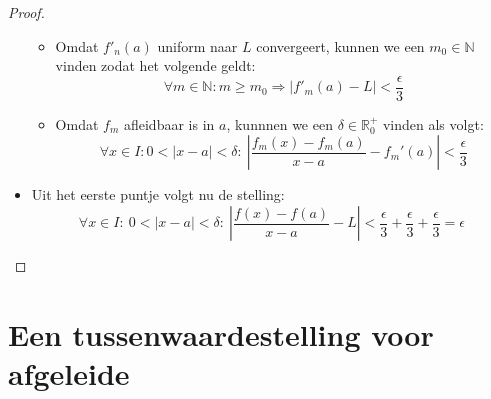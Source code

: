 \documentclass[main.tex]{subfiles}
\begin{document}
\begin{bst}
\begin{proof}
\begin{itemize}
\begin{itemize}
      \item 
        Omdat $f'_{n}(a)$ uniform naar $L$ convergeert, kunnen we een $m_{0} \in \mathbb{N}$ vinden zodat het volgende geldt:
        \[ \forall m\in \mathbb{N}: m \ge m_{0} \Rightarrow \left| f'_{m}(a) - L \right| < \frac{\epsilon}{3}\]
      \item 
        Omdat $f_{m}$ afleidbaar is in $a$, kunnnen we een $\delta \in \mathbb{R}_{0}^{+}$ vinden  als volgt:
        \[ \forall x\in I: 0 < |x-a| < \delta:\ \left| \frac{f_{m}(x)-f_{m}(a)}{x-a} - f_{m}'(a) \right| < \frac{\epsilon}{3} \]
      \end{itemize}
    \item Uit het eerste puntje volgt nu de stelling:
      \[ \forall x\in I:\ 0 < |x-a| < \delta:\ \left| \frac{f(x)-f(a)}{x-a} - L \right|  < \frac{\epsilon}{3}+\frac{\epsilon}{3} +\frac{\epsilon}{3} = \epsilon \]
    \end{itemize}
  \end{proof}
\end{bst}



\section{Een tussenwaardestelling voor afgeleide}
\label{sec:een-tuss-voor}
\end{document}

